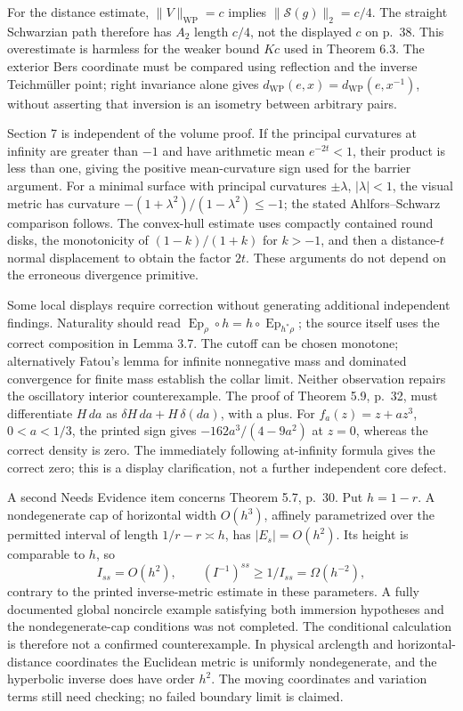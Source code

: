 \documentclass[10pt]{article}
\begin{document}
For the distance estimate, \(\|V\|_{\mathrm{WP}}=c\) implies \(\|\mathcal S(g)\|_2=c/4\). The straight Schwarzian path therefore has \(A_2\) length \(c/4\), not the displayed \(c\) on p. 38. This overestimate is harmless for the weaker bound \(Kc\) used in Theorem 6.3. The exterior Bers coordinate must be compared using reflection and the inverse Teichmüller point; right invariance alone gives \(d_{\mathrm{WP}}(e,x)=d_{\mathrm{WP}}(e,x^{-1})\), without asserting that inversion is an isometry between arbitrary pairs.\par
Section 7 is independent of the volume proof. If the principal curvatures at infinity are greater than \(-1\) and have arithmetic mean \(e^{-2t}<1\), their product is less than one, giving the positive mean-curvature sign used for the barrier argument. For a minimal surface with principal curvatures \(\pm\lambda\), \(|\lambda|<1\), the visual metric has curvature \(-(1+\lambda^2)/(1-\lambda^2)\leq-1\); the stated Ahlfors–Schwarz comparison follows. The convex-hull estimate uses compactly contained round disks, the monotonicity of \((1-k)/(1+k)\) for \(k>-1\), and then a distance-\(t\) normal displacement to obtain the factor \(2t\). These arguments do not depend on the erroneous divergence primitive.\par
Some local displays require correction without generating additional independent findings. Naturality should read \(\operatorname{Ep}_\rho\circ h=h\circ\operatorname{Ep}_{h^*\rho}\); the source itself uses the correct composition in Lemma 3.7. The cutoff can be chosen monotone; alternatively Fatou’s lemma for infinite nonnegative mass and dominated convergence for finite mass establish the collar limit. Neither observation repairs the oscillatory interior counterexample. The proof of Theorem 5.9, p. 32, must differentiate \(H\,da\) as \(\delta H\,da+H\,\delta(da)\), with a plus. For \(f_a(z)=z+az^3\), \(0<a<1/3\), the printed sign gives \(-162a^3/(4-9a^2)\) at \(z=0\), whereas the correct density is zero. The immediately following at-infinity formula gives the correct zero; this is a display clarification, not a further independent core defect.\par
A second Needs Evidence item concerns Theorem 5.7, p. 30. Put \(h=1-r\). A nondegenerate cap of horizontal width \(O(h^3)\), affinely parametrized over the permitted interval of length \(1/r-r\asymp h\), has \(|E_s|=O(h^2)\). Its height is comparable to \(h\), so \[I_{ss}=O(h^2),\qquad (I^{-1})^{ss}\geq 1/I_{ss}=\Omega(h^{-2}),\] contrary to the printed inverse-metric estimate in these parameters. A fully documented global noncircle example satisfying both immersion hypotheses and the nondegenerate-cap conditions was not completed. The conditional calculation is therefore not a confirmed counterexample. In physical arclength and horizontal-distance coordinates the Euclidean metric is uniformly nondegenerate, and the hyperbolic inverse does have order \(h^2\). The moving coordinates and variation terms still need checking; no failed boundary limit is claimed.\par
\end{document}
